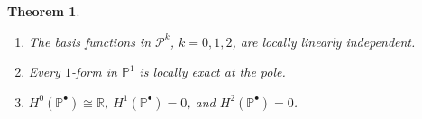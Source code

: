 \documentclass[10pt]{article}
\newcommand{\RR}{{\mathbb{R}}}
\newcommand{\isomorphic}{\cong}
\newcommand{\basis}[1]{\mathcal{#1}}
\newcommand{\vSpace}[1]{\mathbb{#1}}
\newcommand{\complex}[1]{\mathit{\vSpace{#1}^\bullet}}
\newcommand{\cU}{\theta}
\newcommand{\cV}{\rho}
\newcommand{\dcU}{\mathit{d\cU}}
\newcommand{\dcV}{\mathit{d\cV}}
\newcommand{\bsp}{B}
\newcommand{\bspS}{\vSpace{\bsp}}
\newcommand{\polar}{P}
\newcommand{\polarB}{\basis{\polar}}
\newcommand{\polarS}{\vSpace{\polar}}
\newcommand{\polarF}[1]{\polarS^{#1}}
\newcommand{\jet}[2]{J^{#1}\left(#2\right)}
\newcommand{\tint}{\mathrm{int}}
\theoremstyle{plain}
\newtheorem{theorem}{Theorem}[section]
\theoremstyle{definition}
\theoremstyle{remark}
\begin{document}
\begin{theorem}
\begin{enumerate}[label=(\Alph*)]
\begin{itemize}
            \item $\bspS^{1,\tint} \ni f = f_\cU\;\dcU + f_\cV\;\dcV$: $\jet{1}{f_\cU} = 0 = \jet{0}{f_\cV} \Longrightarrow f \in \polarF{1}$,
            \item $\polarF{2} = \left\{\bspS^{2,\tint} \ni f = f_{\cU\cV}\;\dcU\wedge\dcV : \jet{0}{f_{\cU\cV}} = 0\right\}$.
        \end{itemize}
        \item\label{item:local-linear-independence} The basis functions in $\polarB^k$, $k = 0, 1, 2$, are locally linearly independent.
        \item\label{item:local-exactness} Every $1$-form in $\polarF{1}$ is locally exact at the pole.
        \item\label{item:exactness}
        $H^0(\complex{\polar}) \isomorphic \RR$, $H^1(\complex{\polar}) = 0$, and $H^2(\complex{\polar}) = 0$.
    \end{enumerate}
\end{theorem}
\end{document}
